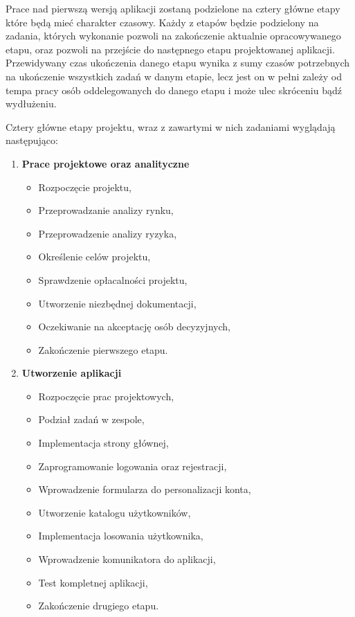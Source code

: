 \documentclass[12pt,a4paper]{article}
\begin{document}
Prace nad pierwszą wersją aplikacji zostaną podzielone na cztery główne etapy które będą mieć charakter czasowy. Każdy z etapów będzie podzielony na zadania, których wykonanie pozwoli na zakończenie aktualnie opracowywanego etapu, oraz pozwoli na przejście do następnego etapu projektowanej aplikacji. Przewidywany czas ukończenia danego etapu wynika z sumy czasów potrzebnych na ukończenie wszystkich zadań w danym etapie, lecz jest on w pełni zależy od tempa pracy osób oddelegowanych do danego etapu i może ulec skróceniu bądź wydłużeniu. 

Cztery główne etapy projektu, wraz z zawartymi w nich zadaniami wyglądają następująco: 
\begin{enumerate}
    \item \textbf{Prace projektowe oraz analityczne}
    \begin{itemize}
        \item Rozpoczęcie projektu,
        \item Przeprowadzanie analizy rynku,
        \item Przeprowadzenie analizy ryzyka,
        \item Określenie celów projektu,
        \item Sprawdzenie opłacalności projektu,
        \item Utworzenie niezbędnej dokumentacji,
        \item Oczekiwanie na akceptację osób decyzyjnych, 
        \item Zakończenie pierwszego etapu.
    \end{itemize}
    \item \textbf{Utworzenie aplikacji}
    \begin{itemize}
        \item Rozpoczęcie prac projektowych,
        \item Podział zadań w zespole,
        \item Implementacja strony głównej, 
        \item Zaprogramowanie logowania oraz rejestracji, 
        \item Wprowadzenie formularza do personalizacji konta, 
        \item Utworzenie katalogu użytkowników, 
        \item Implementacja losowania użytkownika, 
        \item Wprowadzenie komunikatora do aplikacji, 
        \item Test kompletnej aplikacji, 
        \item Zakończenie drugiego etapu.

\end{itemize}
\end{enumerate}
\end{document}
